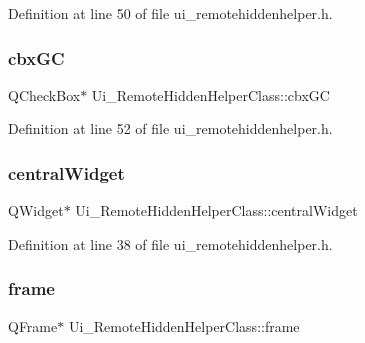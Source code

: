 Definition at line 50 of file ui\+\_\+remotehiddenhelper.\+h.

\hypertarget{class_ui___remote_hidden_helper_class_a51b54c903e7919f1b6518d013116e58e}{}\label{class_ui___remote_hidden_helper_class_a51b54c903e7919f1b6518d013116e58e} 
\subsubsection{\texorpdfstring{cbx\+GC}{cbxGC}}
{\footnotesize\ttfamily Q\+Check\+Box$\ast$ Ui\+\_\+\+Remote\+Hidden\+Helper\+Class\+::cbx\+GC}



Definition at line 52 of file ui\+\_\+remotehiddenhelper.\+h.

\hypertarget{class_ui___remote_hidden_helper_class_a28470fdc0142e3db77eecdb15fbef5af}{}\label{class_ui___remote_hidden_helper_class_a28470fdc0142e3db77eecdb15fbef5af} 
\subsubsection{\texorpdfstring{central\+Widget}{centralWidget}}
{\footnotesize\ttfamily Q\+Widget$\ast$ Ui\+\_\+\+Remote\+Hidden\+Helper\+Class\+::central\+Widget}



Definition at line 38 of file ui\+\_\+remotehiddenhelper.\+h.

\hypertarget{class_ui___remote_hidden_helper_class_aff7dcaaffceec85210d256c0e1bd0e2a}{}\label{class_ui___remote_hidden_helper_class_aff7dcaaffceec85210d256c0e1bd0e2a} 
\subsubsection{\texorpdfstring{frame}{frame}}
{\footnotesize\ttfamily Q\+Frame$\ast$ Ui\+\_\+\+Remote\+Hidden\+Helper\+Class\+::frame}



